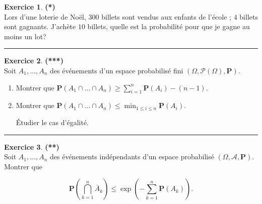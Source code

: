 \documentclass[a4paper,11pt]{article}
\theoremstyle{definition}
\newtheorem{exo}{Exercice} %
\begin{document}
\begin{minipage}{1\linewidth}\begin{minipage}[c]{0.48\linewidth}\raggedright
		
		\begin{exo}\textbf{(*)}\quad\\[0.2cm]
			Lors d'une loterie de Noël, $300$ billets sont
			vendus aux enfants de l'école ; $4$ billets sont gagnants.
			J'achète $10$ billets, quelle est la probabilité pour que je gagne au moins un lot?
			
			\centering\rule{1\linewidth}{0.6pt}\end{exo}
		

		
		
		
	\begin{exo}\textbf{(***)}\quad\\[0.2cm]
		
		Soit $A_{1}, \ldots, A_{n}$ des événements d'un espace probabilisé fini $(\Omega, \mathscr{P}(\Omega), \mathbf{P})$.
		\begin{enumerate}
			\item Montrer que
			$\mathbf{P}\left(A_{1} \cap \ldots \cap A_{n}\right) \geq \sum_{i=1}^{n} \mathbf{P}\left(A_{i}\right)-(n-1)$.
			\item Montrer que $\mathbf{P}\left(A_{1} \cap \ldots \cap A_{n}\right) \leq \min _{1 \leq i \leq n} \mathbf{P}\left(A_{i}\right)$. 
			
			Étudier le cas d'égalité.
			
		\end{enumerate}
		\centering\rule{1\linewidth}{0.6pt}\end{exo}
		
		
		
		
	\end{minipage}\hfill\vrule\hfill\begin{minipage}[c]{0.48\linewidth}\raggedright
		
		\begin{exo}\textbf{(**)}\quad\\[0.2cm]
			Soit $A_{1}, \ldots, A_{n}$ des événements indépendants d'un espace probabilisé $(\Omega, \mathscr{A}, \mathbf{P})$. Montrer que
			
			$$
			\mathbf{P}\left(\bigcap_{k=1}^{n} \bar{A}_{k}\right) \leq \exp \left(-\sum_{k=1}^{n} \mathbf{P}\left(A_{k}\right)\right) .
			$$
			

\end{exo}
\end{minipage}
\end{minipage}
\end{document}
